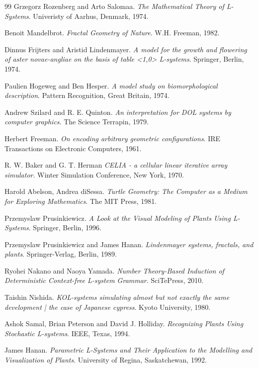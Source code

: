 \documentclass[]{final_report}
\begin{document}
\begin{thebibliography}{99}
 Grzegorz Rozenberg and Arto Salomaa. \emph{The Mathematical Theory of L-Systems}. Univeristy of Aarhus, Denmark, 1974.

 Benoit Mandelbrot. \emph{Fractal Geometry of Nature}. W.H. Freeman, 1982.

 Dinnus Frijters and Aristid Lindenmayer. \emph{A model for the growth and flowering of aster novae-angliae on the basis of table <1,0> L-systems}. Springer, Berlin, 1974.

 Paulien Hogeweg and Ben Hesper. \emph{A model study on biomorphological description}. Pattern Recognition, Great Britain, 1974.

 Andrew Szilard and R. E. Quinton. \emph{An interpretation for DOL systems by computer graphics}. The Science Terrapin, 1979.

 Herbert Freeman. \emph{On encoding arbitrary geometric configurations}. IRE Transactions on Electronic Computers, 1961.

 R. W. Baker and G. T. Herman \emph{CELIA - a cellular linear iterative array simulator}. Winter Simulation Conference, New York, 1970.

 Harold Abelson, Andrea diSessa. \emph{Turtle Geometry: The Computer as a Medium for Exploring Mathematics}. The MIT Press, 1981.

 Przemyslaw Prusinkiewicz. \emph{A Look at the Visual Modeling of Plants Using L-Systems}. Springer, Berlin, 1996.

 Przemyslaw Prusinkiewicz and James Hanan. \emph{Lindenmayer systems, fractals, and plants}. Springer-Verlag, Berlin, 1989.

 Ryohei Nakano and Naoya Yamada. \emph{Number Theory-Based Induction of Deterministic Context-free L-system Grammar}. SciTePress, 2010.

 Taishin Nishida. \emph{KOL-systems simulating almost but not exactly the same development | the case of Japanese cypress}. Kyoto University, 1980.

 Ashok Samal, Brian Peterson and David J. Holliday. \emph{Recognizing Plants Using Stochastic L-systems}. IEEE, Texas, 1994.

 James Hanan. \emph{Parametric L-Systems and Their Application to the Modelling and Visualization of Plants}. University of Regina, Saskatchewan, 1992.


\end{thebibliography}
\end{document}
